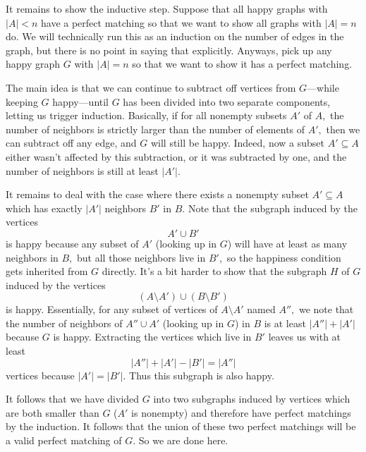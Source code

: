 It remains to show the inductive step. Suppose that all happy graphs with $|A|<n$ have a perfect matching so that we want to show all graphs with $|A|=n$ do. We will technically run this as an induction on the number of edges in the graph, but there is no point in saying that explicitly. Anyways, pick up any happy graph $G$ with $|A|=n$ so that we want to show it has a perfect matching.

The main idea is that we can continue to subtract off vertices from $G$---while keeping $G$ happy---until $G$ has been divided into two separate components, letting us trigger induction. Basically, if for all nonempty subsets $A'$ of $A,$ the number of neighbors is strictly larger than the number of elements of $A',$ then we can subtract off any edge, and $G$ will still be happy. Indeed, now a subset $A'\subseteq A$ either wasn't affected by this subtraction, or it was subtracted by one, and the number of neighbors is still at least $|A'|.$

It remains to deal with the case where there exists a nonempty subset $A'\subseteq A$ which has exactly $|A'|$ neighbors $B'$ in $B.$ Note that the subgraph induced by the vertices
\[A'\cup B'\]
is happy because any subset of $A'$ (looking up in $G$) will have at least as many neighbors in $B,$ but all those neighbors live in $B',$ so the happiness condition gets inherited from $G$ directly. It's a bit harder to show that the subgraph $H$ of $G$ induced by the vertices
\[(A\setminus A')\cup(B\setminus B')\]
is happy. Essentially, for any subset of vertices of $A\setminus A'$ named $A'',$ we note that the number of neighbors of $A''\cup A'$ (looking up in $G$) in $B$ is at least $|A''|+|A'|$ because $G$ is happy. Extracting the vertices which live in $B'$ leaves us with at least
\[|A''|+|A'|-|B'|=|A''|\]
vertices because $|A'|=|B'|.$ Thus this subgraph is also happy.

It follows that we have divided $G$ into two subgraphs induced by vertices which are both smaller than $G$ ($A'$ is nonempty) and therefore have perfect matchings by the induction. It follows that the union of these two perfect matchings will be a valid perfect matching of $G.$ So we are done here.

